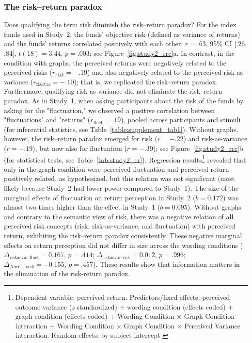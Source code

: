 \documentclass[a4paper,man, natbib,floatsintext]{apa6} %
\begin{document}
{\subsubsection{The risk--return paradox}
Does qualifying the term risk diminish the risk--return paradox? For the index funds used in Study~2, the funds' objective risk (defined as variance of returns) and the funds' returns correlated positively with each other, $r = .63$, 95\% CI $[.26$, $.84]$, $t(18) = 3.44$, $p = .003$; see Figure~\ref{fig:study2_rrc}a. In contrast, in the condition with graphs, the perceived returns were negatively related to the perceived risks  ($r_{risk} = -.19$) and also negatively related to the perceived risk-as-variance ($r_{\text{riskvar}}=-.10$); that is, we replicated the risk--return paradox. Furthermore, qualifying risk as variance did not eliminate the risk--return paradox. As in Study~1, when asking participants about the risk of the funds by asking for the "fluctuation," we observed a positive correlation between "fluctuations" and "returns" ($r_{\text{fluct}} = .19$), pooled across participants and stimuli (for inferential statistics, see Table~\ref{table:supplement_tab1}). Without graphs, however, the risk--return paradox emerged for risk ($r = -.22$) and risk-as-variance ($r= -.19$), but now also for fluctuation ($r=-.39$); see Figure~\ref{fig:study2_rrc}b (for statistical tests, see Table~\ref{tab:study2_rr}).  Regression results\footnote{Dependent variable: perceived return. Predictors/fixed effects: perceived outcome variance (\textit{z} standardized) $+$ wording condition (effects coded) $+$ graph condition (effects coded) $+$ Wording Condition $\times$ Graph Condition interaction $+$ Wording Condition $\times$ Graph Condition $\times$ Perceived Variance interaction. Random effects: by-subject intercept \citep[For an explanation of effects coding, see][]{Singmann2019}} revealed that only in the graph condition were perceived fluctuation and perceived return positively related, as hypothesized, but this relation was not significant (most likely because Study~2 had lower power compared to Study~1). The size of the marginal effects of fluctuation on return perception in Study~2 ($b=0.172$) was almost two times higher than the effect in Study~1 ($b=0.095$). Without graphs and contrary to the semantic view of risk, there was a negative relation of all perceived risk concepts (risk, risk-as-variance, and fluctuation) with perceived return, exhibiting the risk--return paradox consistently. These negative marginal effects on return perception did not differ in size across the wording conditions ($\Delta_{\text{riskasvar-fluct}}=0.167$, $p=.414$; $\Delta_{\text{riskasvar-risk}}=0.012$, $p=.996$; $\Delta_{fluct-risk}=-0.155$, $p=.457$). These results show that information matters in the elimination of the risk-return paradox.

}
\end{document}
